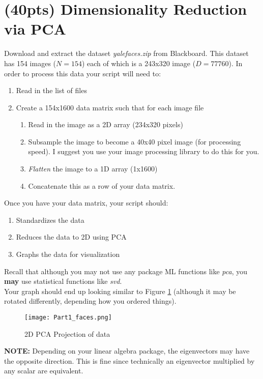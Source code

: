 \documentclass[12pt]{article}
\begin{document}
\newpage
\section{(40pts) Dimensionality Reduction via PCA}\label{pca}
Download and extract the dataset \emph{yalefaces.zip} from Blackboard.  This dataset has 154 images ($N=154$) each of which is a 243x320 image ($D=77760$).  In order to process this data your script will need to:

\begin{enumerate}
\item Read in the list of files
\item Create a 154x1600 data matrix such that for each image file
	\begin{enumerate}
	\item Read in the image as a 2D array (234x320 pixels)
	\item Subsample the image to become a 40x40 pixel image (for processing speed).  I suggest you use your image processing library to do this for you.
	\item \emph{Flatten} the image to a 1D array (1x1600)
	\item Concatenate this as a row of your data matrix.
	\end{enumerate}
\end{enumerate}

\noindent
Once you have your data matrix, your script should:
\begin{enumerate}
  \item Standardizes the data
  \item Reduces the data to 2D using PCA
  \item Graphs the data for visualization
\end{enumerate}

\noindent
Recall that although you may not use any package ML functions like \emph{pca}, you \textbf{may} use statistical functions like \emph{svd}.\\

\noindent
Your graph should end up looking similar to Figure \ref{PCA} (although it may be rotated differently, depending how you ordered things).
\begin{figure}[H]
\begin{center}
\texttt{[image: Part1\_faces.png]}
\caption{2D PCA Projection of data}
\label{PCA}
\end{center}
\end{figure}

\textbf{NOTE:} Depending on your linear algebra package, the eigenvectors may have the opposite direction.  This is fine since technically an eigenvector multiplied by any scalar are equivalent.
\end{document}
